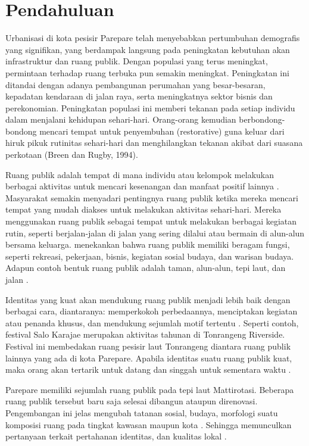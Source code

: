 \documentclass[11pt]{simart} %
\begin{document}
\section{Pendahuluan}

Urbanisasi di kota pesisir Parepare telah menyebabkan pertumbuhan demografis yang signifikan, yang berdampak langsung pada peningkatan kebutuhan akan infrastruktur dan ruang publik. Dengan populasi yang terus meningkat, permintaan terhadap ruang terbuka pun semakin meningkat. Peningkatan ini ditandai dengan adanya pembangunan perumahan yang besar-besaran, kepadatan kendaraan di jalan raya, serta meningkatnya sektor bisnis dan perekonomian. Peningkatan populasi ini memberi tekanan pada setiap individu dalam menjalani kehidupan sehari-hari. Orang-orang kemudian berbondong-bondong mencari tempat untuk penyembuhan (restorative) guna keluar dari hiruk pikuk rutinitas sehari-hari dan menghilangkan tekanan akibat dari suasana perkotaan (Breen dan Rugby, 1994).

Ruang publik adalah tempat di mana individu atau kelompok melakukan berbagai aktivitas untuk mencari kesenangan dan manfaat positif lainnya \citep{hajmirsadeghi2012}. Masyarakat semakin menyadari pentingnya ruang publik ketika mereka mencari tempat yang mudah diakses untuk melakukan aktivitas sehari-hari. Mereka menggunakan ruang publik sebagai tempat untuk melakukan berbagai kegiatan rutin, seperti berjalan-jalan di jalan yang sering dilalui atau bermain di alun-alun bersama keluarga. \cite{hajmirsadeghi2012} menekankan bahwa ruang publik memiliki beragam fungsi, seperti rekreasi, pekerjaan, bisnis, kegiatan sosial budaya, dan warisan budaya. Adapun contoh bentuk ruang publik adalah taman, alun-alun, tepi laut, dan jalan \citep{hajmirsadeghi2012}.

Identitas yang kuat akan mendukung ruang publik menjadi lebih baik dengan berbagai cara, diantaranya: memperkokoh perbedaannya, menciptakan kegiatan atau penanda khusus, dan mendukung sejumlah motif tertentu \citep{hartanti2014}. Seperti contoh, festival Salo Karajae merupakan aktivitas tahunan di Tonrangeng Riverside. Festival ini membedakan ruang pesisir laut Tonrangeng diantara ruang publik lainnya yang ada di kota Parepare. Apabila identitas suatu ruang publik kuat, maka orang akan tertarik untuk datang dan singgah untuk sementara waktu \citep{oktay2002}.

Parepare memiliki sejumlah ruang publik pada tepi laut Mattirotasi. Beberapa ruang publik tersebut baru saja selesai dibangun ataupun direnovasi. Pengembangan ini jelas mengubah tatanan sosial, budaya, morfologi suatu komposisi ruang pada tingkat kawasan maupun kota \citep{kaymaz2013,oktay2002}. Sehingga memunculkan pertanyaan terkait pertahanan identitas, dan kualitas lokal \citep{kaymaz2013}.
\end{document}
